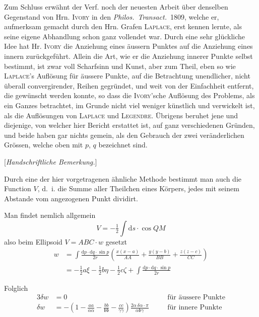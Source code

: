 \documentclass[11pt,a4paper]{article}
\begin{document}
Zum Schluss erwähnt der Verf. noch der neuesten Arbeit über denselben Gegenstand von Hrn. \textsc{Ivory} in den \textit{Philos.\ Transact.}\ 1809, welche er, aufmerksam gemacht durch den Hrn. Grafen \textsc{Laplace}, erst kennen lernte, als seine eigene Abhandlung schon ganz vollendet war. Durch eine sehr glückliche Idee hat Hr. \textsc{Ivory} die Anziehung eines äussern Punktes auf die Anziehung eines innern zurückgeführt. Allein die Art, wie er die Anziehung innerer Punkte selbst bestimmt, ist zwar voll Scharfsinn und Kunst, aber zum Theil, eben so wie \textsc{Laplace}'s Auflösung für äussere Punkte, auf die Betrachtung unendlicher, nicht überall convergirender, Reihen gegründet, und weit von der Einfachheit entfernt, die gewünscht werden konnte, so dass die \textsc{Ivory}'sche Auflösung des Problems, als ein Ganzes betrachtet, im Grunde nicht viel weniger künstlich und verwickelt ist, als die Auflösungen von \textsc{Laplace} und \textsc{Legendre}. Übrigens beruhet jene und diejenige, von welcher hier Bericht erstattet ist, auf ganz verschiedenen Gründen, und beide haben gar nichts gemein, als den Gebrauch der zwei veränderlichen Grössen, welche oben mit $p$, $q$ bezeichnet sind.

\begin{center}
[\textit{Handschriftliche Bemerkung.}]
\end{center}

Durch eine der hier vorgetragenen ähnliche Methode bestimmt man auch die Function $V$, d.~i. die Summe aller Theilchen eines Körpers, jedes mit seinem Abstande vom angezogenen Punkt dividirt.

Man findet nemlich allgemein
\[
V = -\tfrac12 \int \mathrm{d}s \cdot \cos QM
\]
also beim Ellipsoid $V = ABC \cdot w$ gesetzt
\begin{align*}
w &= \int \frac{\mathrm{d}p \cdot \mathrm{d}q \cdot \sin p}{2r} \left(\frac{x(x-a)}{AA} + \frac{y(y-b)}{BB} + \frac{z(z-c)}{CC}\right) \\
  &= -\tfrac12 a\xi - \tfrac12 b\eta - \tfrac12 c\zeta + \int \frac{\mathrm{d}p \cdot \mathrm{d}q \cdot \sin p}{2r}
\end{align*}

Folglich
\begin{alignat*}{3}
\delta w &= 0 \quad && \text{für äussere Punkte} \\
\delta w &= -(1 - \tfrac{aa}{\alpha\alpha} - \tfrac{bb}{\mathfrak{b}\mathfrak{b}} - \tfrac{cc}{\gamma\gamma}) \tfrac{2\alpha\,\delta\alpha \cdot \pi}{\alpha\mathfrak{b}\gamma} \quad && \text{für innere Punkte}
\end{alignat*}
\end{document}
